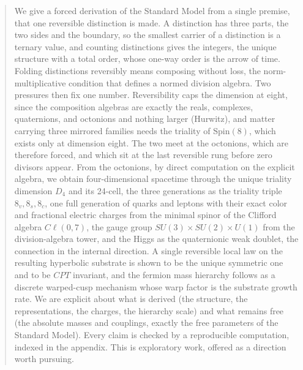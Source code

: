 \begin{abstract}
We give a forced derivation of the Standard Model from a single premise, that one reversible distinction is made.
A distinction has three parts, the two sides and the boundary, so the smallest carrier of a distinction is a ternary
value, and counting distinctions gives the integers, the unique structure with a total order, whose one-way order is
the arrow of time. Folding distinctions reversibly means composing without loss, the norm-multiplicative condition that
defines a normed division algebra. Two pressures then fix one number. Reversibility caps the dimension at eight, since
the composition algebras are exactly the reals, complexes, quaternions, and octonions and nothing larger (Hurwitz),
and matter carrying three mirrored families needs the triality of $\mathrm{Spin}(8)$, which exists only at dimension
eight. The two meet at the octonions, which are therefore forced, and which sit at the last reversible rung before
zero divisors appear. From the octonions, by direct computation on the explicit algebra, we obtain four-dimensional
spacetime through the unique triality dimension $D_4$ and its 24-cell, the three generations as the triality triple
$8_v, 8_s, 8_c$, one full generation of quarks and leptons with their exact color and fractional electric charges from
the minimal spinor of the Clifford algebra $C\ell(0,7)$, the gauge group $SU(3)\times SU(2)\times U(1)$ from the
division-algebra tower, and the Higgs as the quaternionic weak doublet, the connection in the internal direction. A
single reversible local law on the resulting hyperbolic substrate is shown to be the unique symmetric one and to be
$CPT$ invariant, and the fermion mass hierarchy follows as a discrete warped-cusp mechanism whose warp factor is the
substrate growth rate. We are explicit about what is derived (the structure, the representations, the charges, the
hierarchy scale) and what remains free (the absolute masses and couplings, exactly the free parameters of the Standard
Model). Every claim is checked by a reproducible computation, indexed in the appendix. This is exploratory work,
offered as a direction worth pursuing.
\end{abstract}
